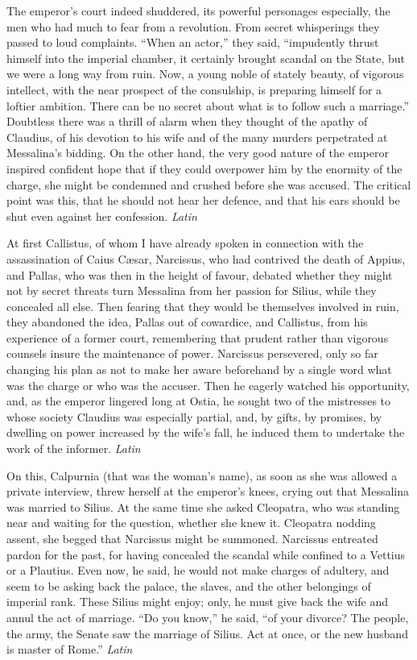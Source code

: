 
The emperor's court indeed shuddered, its powerful personages especially, the men who had much to fear from a revolution. From secret whisperings they passed to loud complaints. ``When an actor,'' they said, ``impudently thrust himself into the imperial chamber, it certainly brought scandal on the State, but we were a long way from ruin. Now, a young noble of stately beauty, of vigorous intellect, with the near prospect of the consulship, is preparing himself for a loftier ambition. There can be no secret about what is to follow such a marriage.'' Doubtless there was a thrill of alarm when they thought of the apathy of Claudius, of his devotion to his wife and of the many murders perpetrated at Messalina's bidding. On the other hand, the very good nature of the emperor inspired confident hope that if they could overpower him by the enormity of the charge, she might be condemned and crushed before she was accused. The critical point was this, that he should not hear her defence, and that his ears should be shut even against her confession. \emph{Latin}


At first Callistus, of whom I have already spoken in connection with the assassination of Caius Cæsar, Narcissus, who had contrived the death of Appius, and Pallas, who was then in the height of favour, debated whether they might not by secret threats turn Messalina from her passion for Silius, while they concealed all else. Then fearing that they would be themselves involved in ruin, they abandoned the idea, Pallas out of cowardice, and Callistus, from his experience of a former court, remembering that prudent rather than vigorous counsels insure the maintenance of power. Narcissus persevered, only so far changing his plan as not to make her aware beforehand by a single word what was the charge or who was the accuser. Then he eagerly watched his opportunity, and, as the emperor lingered long at Ostia, he sought two of the mistresses to whose society Claudius was especially partial, and, by gifts, by promises, by dwelling on power increased by the wife's fall, he induced them to undertake the work of the informer. \emph{Latin}


On this, Calpurnia (that was the woman's name), as soon as she was allowed a private interview, threw herself at the emperor's knees, crying out that Messalina was married to Silius. At the same time she asked Cleopatra, who was standing near and waiting for the question, whether she knew it. Cleopatra nodding assent, she begged that Narcissus might be summoned. Narcissus entreated pardon for the past, for having concealed the scandal while confined to a Vettius or a Plautius. Even now, he said, he would not make charges of adultery, and seem to be asking back the palace, the slaves, and the other belongings of imperial rank. These Silius might enjoy; only, he must give back the wife and annul the act of marriage. ``Do you know,'' he said, ``of your divorce? The people, the army, the Senate saw the marriage of Silius. Act at once, or the new husband is master of Rome.'' \emph{Latin}

